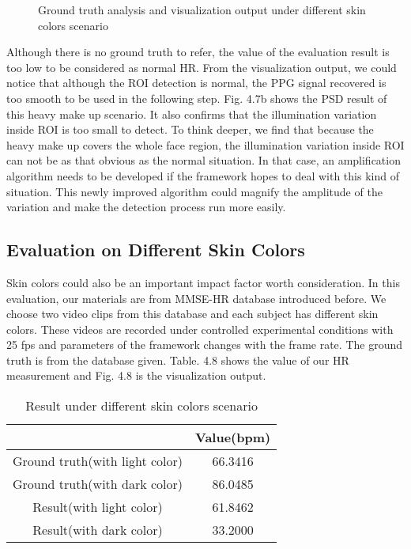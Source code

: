 \begin{figure}[ht]
\hspace{-0.3in}
\caption{Ground truth analysis and visualization output under different skin colors scenario}\label{fig:noted-figure}
\end{figure}

Although there is no ground truth to refer, the value of the evaluation result is too low to be considered as normal HR. From the visualization output, we could notice that although the ROI detection is normal, the PPG signal recovered is too smooth to be used in the following step. Fig. 4.7b shows the PSD result of this heavy make up scenario. It also confirms that the illumination variation inside ROI is too small to detect. To think deeper, we find that because the heavy make up covers the whole face region, the illumination variation inside ROI can not be as that obvious as the normal situation. In that case, an amplification algorithm needs to be developed if the framework hopes to deal with this kind of situation. This newly improved algorithm could magnify the amplitude of the variation and make the detection process run more easily.

\subsection{Evaluation on Different Skin Colors}
Skin colors could also be an important impact factor worth consideration. In this evaluation, our materials are from MMSE-HR database introduced before. We choose two video clips from this database and each subject has different skin colors. These videos are recorded under controlled experimental conditions with 25 fps and parameters of the framework changes with the frame rate. The ground truth is from the database given. Table. 4.8 shows the value of our HR measurement and Fig. 4.8 is the visualization output.


\begin{table}[htbp]
\centering
\caption{Result under different skin colors scenario} \label{tab:simpletable}
\begin{tabular}{|c|c|}
    \hline
     & Value(bpm) \\
    \hline
    Ground truth(with light color) & 66.3416 \\
    \hline
    Ground truth(with dark color) & 86.0485 \\
    \hline
    Result(with light color) & 61.8462 \\
    \hline
    Result(with dark color) & 33.2000 \\
    \hline
\end{tabular}
\end{table}

